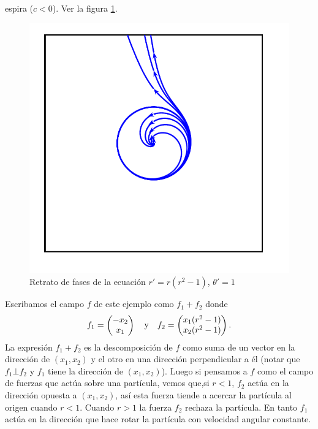 \begin{ejemplo}{espira}
($c<0$). Ver la figura \ref{espiralitos}.
\begin{figure}[h]
\begin{center}
\includegraphics[scale=.3]{imagenes/RetraFasesEspirales.png}
\end{center}
\caption{Retrato de fases de la ecuación $r'=r(r^2-1)$,
$\theta'=1$}\label{espiralitos}
\end{figure}
Escribamos el campo $f$ de este ejemplo  como $f_1+f_2$ donde
\[
    f_1=\begin{pmatrix} -x_2\\ x_1\end{pmatrix}\quad\hbox{y}\quad f_2
    =\begin{pmatrix} x_1(r^2-1)\\ x_2(r^2-1)\end{pmatrix}.
\]
La expresión $f_1+f_2$ es la descomposición de $f$ como suma de un
vector en la dirección de $(x_1,x_2)$ y el otro en una dirección
perpendicular a él (notar que $f_1 \bot f_2$ y $f_1$ tiene la
dirección de $(x_1,x_2)$). Luego si pensamos a $f$ como el campo
de fuerzas que actúa sobre una partícula, vemos que,si $r<1$,
$f_2$ actúa en la dirección opuesta a $(x_1,x_2)$, así esta fuerza
tiende a acercar la partícula al origen cuando $r<1$. Cuando $r>1$
la fuerza $f_2$ rechaza la partícula. En tanto $f_1$  actúa en la
dirección que hace rotar la partícula con velocidad angular
constante.
\end{ejemplo}



